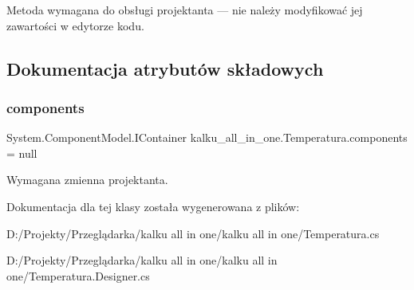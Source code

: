 Metoda wymagana do obsługi projektanta — nie należy modyfikować jej zawartości w edytorze kodu. 



\subsection{Dokumentacja atrybutów składowych}
\mbox{\label{classkalku__all__in__one_1_1_temperatura_ad71ec6a4400ab643b5367db27476886a}} 
\subsubsection{\texorpdfstring{components}{components}}
{\footnotesize\ttfamily System.\+Component\+Model.\+I\+Container kalku\+\_\+all\+\_\+in\+\_\+one.\+Temperatura.\+components = null\hspace{0.3cm}{\ttfamily [private]}}



Wymagana zmienna projektanta. 



Dokumentacja dla tej klasy została wygenerowana z plików\+:\begin{DoxyCompactItemize}
\item 
D\+:/\+Projekty/\+Przeglądarka/kalku all in one/kalku all in one/Temperatura.\+cs\item 
D\+:/\+Projekty/\+Przeglądarka/kalku all in one/kalku all in one/Temperatura.\+Designer.\+cs\end{DoxyCompactItemize}
